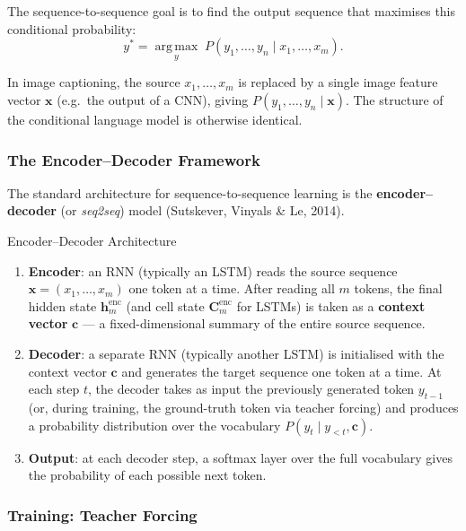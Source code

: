 \documentclass[11pt,a4paper]{article}
\newcommand{\term}[1]{\textcolor{DefGreen}{\textbf{#1}}}
\begin{document}
The sequence-to-sequence goal is to find the output sequence that maximises this conditional probability:
\[
  y^* = \operatorname*{arg\,max}_{y}\; P(y_1, \ldots, y_n \mid x_1, \ldots, x_m).
\]

\begin{notebox}
In image captioning, the source $x_1, \ldots, x_m$ is replaced by a single image feature vector $\mathbf{x}$ (e.g.\ the output of a CNN), giving $P(y_1, \ldots, y_n \mid \mathbf{x})$. The structure of the conditional language model is otherwise identical.
\end{notebox}

\subsubsection{The Encoder--Decoder Framework}
\label{sec:encoder_decoder}

The standard architecture for sequence-to-sequence learning is the \term{encoder--decoder} (or \emph{seq2seq}) model (Sutskever, Vinyals \& Le, 2014).

\begin{thmbox}{Encoder--Decoder Architecture}
\begin{enumerate}
  \item \textbf{Encoder}: an RNN (typically an LSTM) reads the source sequence $\mathbf{x} = (x_1, \ldots, x_m)$ one token at a time. After reading all $m$ tokens, the final hidden state $\mathbf{h}_m^{\text{enc}}$ (and cell state $\mathbf{C}_m^{\text{enc}}$ for LSTMs) is taken as a \term{context vector} $\mathbf{c}$ — a fixed-dimensional summary of the entire source sequence.
  \item \textbf{Decoder}: a separate RNN (typically another LSTM) is initialised with the context vector $\mathbf{c}$ and generates the target sequence one token at a time. At each step $t$, the decoder takes as input the previously generated token $y_{t-1}$ (or, during training, the ground-truth token via teacher forcing) and produces a probability distribution over the vocabulary $P(y_t \mid y_{<t}, \mathbf{c})$.
  \item \textbf{Output}: at each decoder step, a softmax layer over the full vocabulary gives the probability of each possible next token.
\end{enumerate}
\end{thmbox}

\subsubsection{Training: Teacher Forcing}
\end{document}
